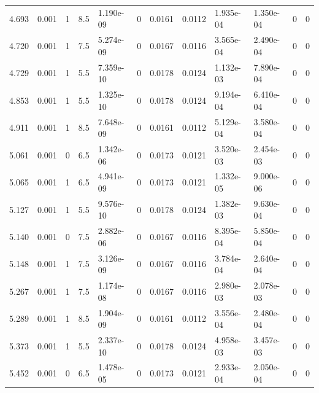 \documentclass[preview]{standalone}
\begin{document}
{{{\begin{tabular}{L{1.2cm}C{1.2cm} C{0.3cm}C{0.5cm} C{1.4cm}C{1.4cm} C{1.4cm}C{1.4cm} C{1.6cm}C{1.6cm} C{1.6cm}C{1.6cm}}
  4.693  &  0.001  & 1     & 8.5 &  1.190e-09  & 0  &  0.0161&   0.0112& 1.935e-04 & 1.350e-04   &  0 & 0  \\ 
  4.720  &  0.001  & 1     & 7.5 &  5.274e-09  & 0  &  0.0167&   0.0116& 3.565e-04 & 2.490e-04   &  0 & 0  \\ 
  4.729  &  0.001  & 1     & 5.5 &  7.359e-10  & 0  &  0.0178&   0.0124& 1.132e-03 & 7.890e-04   &  0 & 0  \\ 
  4.853  &  0.001  & 1     & 5.5 &  1.325e-10  & 0  &  0.0178&   0.0124& 9.194e-04 & 6.410e-04   &  0 & 0  \\ 
  4.911  &  0.001  & 1     & 8.5 &  7.648e-09  & 0  &  0.0161&   0.0112& 5.129e-04 & 3.580e-04   &  0 & 0  \\ 
  5.061  &  0.001  & 0     & 6.5 &  1.342e-06  & 0  &  0.0173&   0.0121& 3.520e-03 & 2.454e-03   &  0 & 0  \\ 
  5.065  &  0.001  & 1     & 6.5 &  4.941e-09  & 0  &  0.0173&   0.0121& 1.332e-05 & 9.000e-06   &  0 & 0  \\ 
  5.127  &  0.001  & 1     & 5.5 &  9.576e-10  & 0  &  0.0178&   0.0124& 1.382e-03 & 9.630e-04   &  0 & 0  \\ 
  5.140  &  0.001  & 0     & 7.5 &  2.882e-06  & 0  &  0.0167&   0.0116& 8.395e-04 & 5.850e-04   &  0 & 0  \\ 
  5.148  &  0.001  & 1     & 7.5 &  3.126e-09  & 0  &  0.0167&   0.0116& 3.784e-04 & 2.640e-04   &  0 & 0  \\ 
  5.267  &  0.001  & 1     & 7.5 &  1.174e-08  & 0  &  0.0167&   0.0116& 2.980e-03 & 2.078e-03   &  0 & 0  \\ 
  5.289  &  0.001  & 1     & 8.5 &  1.904e-09  & 0  &  0.0161&   0.0112& 3.556e-04 & 2.480e-04   &  0 & 0  \\ 
  5.373  &  0.001  & 1     & 5.5 &  2.337e-10  & 0  &  0.0178&   0.0124& 4.958e-03 & 3.457e-03   &  0 & 0  \\ 
  5.452  &  0.001  & 0     & 6.5 &  1.478e-05  & 0  &  0.0173&   0.0121& 2.933e-04 & 2.050e-04   &  0 & 0  \\ 
\hline 
\end{tabular} 

}}}
\end{document}
